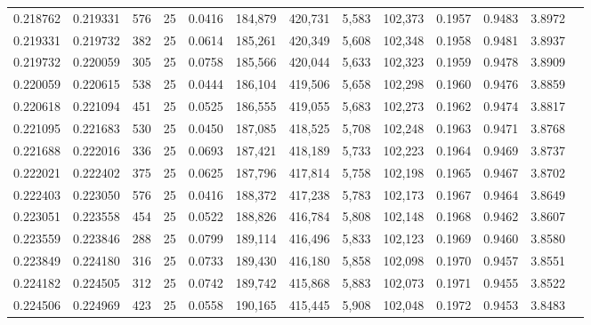 \begin{tabular}{rrrrrrrrrrrrr}
0.218762 & 0.219331 &   576 &  25 &                                     0.0416 & 184,879 & 420,731 &   5,583 & 102,373 & 0.1957 & 0.9483 & 3.8972 \\
0.219331 & 0.219732 &   382 &  25 &                                     0.0614 & 185,261 & 420,349 &   5,608 & 102,348 & 0.1958 & 0.9481 & 3.8937 \\
0.219732 & 0.220059 &   305 &  25 &                                     0.0758 & 185,566 & 420,044 &   5,633 & 102,323 & 0.1959 & 0.9478 & 3.8909 \\
0.220059 & 0.220615 &   538 &  25 &                                     0.0444 & 186,104 & 419,506 &   5,658 & 102,298 & 0.1960 & 0.9476 & 3.8859 \\
0.220618 & 0.221094 &   451 &  25 &                                     0.0525 & 186,555 & 419,055 &   5,683 & 102,273 & 0.1962 & 0.9474 & 3.8817 \\
0.221095 & 0.221683 &   530 &  25 &                                     0.0450 & 187,085 & 418,525 &   5,708 & 102,248 & 0.1963 & 0.9471 & 3.8768 \\
0.221688 & 0.222016 &   336 &  25 &                                     0.0693 & 187,421 & 418,189 &   5,733 & 102,223 & 0.1964 & 0.9469 & 3.8737 \\
0.222021 & 0.222402 &   375 &  25 &                                     0.0625 & 187,796 & 417,814 &   5,758 & 102,198 & 0.1965 & 0.9467 & 3.8702 \\
0.222403 & 0.223050 &   576 &  25 &                                     0.0416 & 188,372 & 417,238 &   5,783 & 102,173 & 0.1967 & 0.9464 & 3.8649 \\
0.223051 & 0.223558 &   454 &  25 &                                     0.0522 & 188,826 & 416,784 &   5,808 & 102,148 & 0.1968 & 0.9462 & 3.8607 \\
0.223559 & 0.223846 &   288 &  25 &                                     0.0799 & 189,114 & 416,496 &   5,833 & 102,123 & 0.1969 & 0.9460 & 3.8580 \\
0.223849 & 0.224180 &   316 &  25 &                                     0.0733 & 189,430 & 416,180 &   5,858 & 102,098 & 0.1970 & 0.9457 & 3.8551 \\
0.224182 & 0.224505 &   312 &  25 &                                     0.0742 & 189,742 & 415,868 &   5,883 & 102,073 & 0.1971 & 0.9455 & 3.8522 \\
0.224506 & 0.224969 &   423 &  25 &                                     0.0558 & 190,165 & 415,445 &   5,908 & 102,048 & 0.1972 & 0.9453 & 3.8483 \\

\end{tabular}
